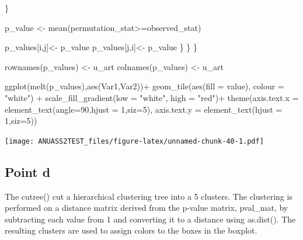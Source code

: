 \documentclass[
]{article}
\newenvironment{Shaded}{\begin{snugshade}}{\end{snugshade}}
\newcommand{\AttributeTok}[1]{\textcolor[rgb]{0.77,0.63,0.00}{#1}}
\newcommand{\DecValTok}[1]{\textcolor[rgb]{0.00,0.00,0.81}{#1}}
\newcommand{\FunctionTok}[1]{\textcolor[rgb]{0.00,0.00,0.00}{#1}}
\newcommand{\NormalTok}[1]{#1}
\newcommand{\OtherTok}[1]{\textcolor[rgb]{0.56,0.35,0.01}{#1}}
\newcommand{\SpecialCharTok}[1]{\textcolor[rgb]{0.00,0.00,0.00}{#1}}
\newcommand{\StringTok}[1]{\textcolor[rgb]{0.31,0.60,0.02}{#1}}
\begin{document}
\begin{Shaded}
\begin{Highlighting}[]
\NormalTok{      \}}
      
\NormalTok{      p\_value }\OtherTok{\textless{}{-}} \FunctionTok{mean}\NormalTok{(permutation\_stat}\SpecialCharTok{\textgreater{}=}\NormalTok{observed\_stat)}
      
\NormalTok{      p\_values[i,j]}\OtherTok{\textless{}{-}}\NormalTok{ p\_value}
\NormalTok{      p\_values[j,i]}\OtherTok{\textless{}{-}}\NormalTok{ p\_value}
\NormalTok{    \}}
\NormalTok{  \}}
\NormalTok{\}}

\FunctionTok{rownames}\NormalTok{(p\_values) }\OtherTok{\textless{}{-}}\NormalTok{ u\_art}
\FunctionTok{colnames}\NormalTok{(p\_values) }\OtherTok{\textless{}{-}}\NormalTok{ u\_art}

\FunctionTok{ggplot}\NormalTok{(}\FunctionTok{melt}\NormalTok{(p\_values),}\FunctionTok{aes}\NormalTok{(Var1,Var2))}\SpecialCharTok{+}
  \FunctionTok{geom\_tile}\NormalTok{(}\FunctionTok{aes}\NormalTok{(}\AttributeTok{fill =}\NormalTok{ value), }\AttributeTok{colour =} \StringTok{"white"}\NormalTok{)  }\SpecialCharTok{+}
  \FunctionTok{scale\_fill\_gradient}\NormalTok{(}\AttributeTok{low =} \StringTok{"white"}\NormalTok{, }\AttributeTok{high =} \StringTok{"red"}\NormalTok{)}\SpecialCharTok{+}
  \FunctionTok{theme}\NormalTok{(}\AttributeTok{axis.text.x =} \FunctionTok{element\_text}\NormalTok{(}\AttributeTok{angle=}\DecValTok{90}\NormalTok{,}\AttributeTok{hjust =} \DecValTok{1}\NormalTok{,}\AttributeTok{siz=}\DecValTok{5}\NormalTok{),}
        \AttributeTok{axis.text.y =} \FunctionTok{element\_text}\NormalTok{(}\AttributeTok{hjust =} \DecValTok{1}\NormalTok{,}\AttributeTok{siz=}\DecValTok{5}\NormalTok{))}
\end{Highlighting}
\end{Shaded}

\texttt{[image: ANUASS2TEST\_files/figure-latex/unnamed-chunk-40-1.pdf]}

\hypertarget{point-d-1}{%
\subsection{Point d}\label{point-d-1}}

The cutree() cut a hierarchical clustering tree into a 5 clusters. The
clustering is performed on a distance matrix derived from the p-value
matrix, pval\_mat, by subtracting each value from 1 and converting it to
a distance using as.dist(). The resulting clusters are used to assign
colors to the boxes in the boxplot.

\begin{Shaded}
\end{Shaded}
\end{document}
